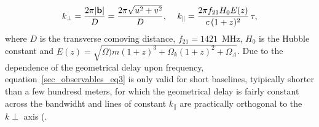 \begin{equation}
k_\perp = \frac{2 \pi |{\bf b}|}{D} = \frac{2 \pi \sqrt{u^2 + v^2}}{D}, \,\,\,\,\,\,\,    k_\parallel = \frac{2 \pi f_{21} H_0 E(z)}{c \, (1 + z)^2} \, \tau,
\label{sec_observables_eq4}
\end{equation}
where $D$ is the transverse comoving distance, $f_{21} = 1421$~MHz, $H_0$ is the Hubble constant and $E(z) = \sqrt{\Omega)m (1+z)^3 + \Omega_k (1+z)^2 + \Omega_\Lambda}$. Due to the dependence of the geometrical delay upon frequency, equation~\ref{sec_observables_eq3} is only valid for short baselines, tyipically shorter than a few hundresd meters, for which the geometrical delay is fairly constant across the bandwidht and lines of constant $k_\parallel$ are practically orthogonal to the $k\perp$ axis (\cite{parsons12b}.

